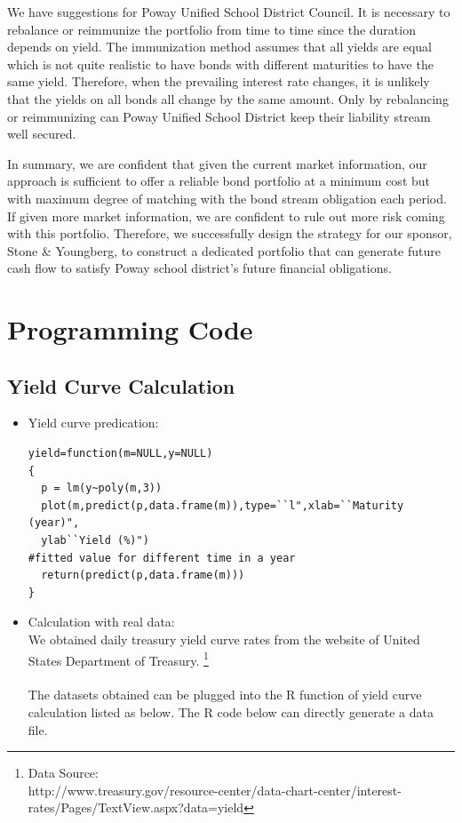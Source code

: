 \documentclass[oneside,12pt]{report}
\begin{document}
{\begin{itemize}
We have suggestions for Poway Unified School District Council. It is necessary to rebalance or reimmunize the portfolio from time to time since the duration depends on yield. The immunization method assumes that all yields are equal which is not quite realistic to have bonds with different maturities to have the same yield. Therefore, when the prevailing interest rate changes, it is unlikely that the yields on all bonds all change by the same amount. Only by rebalancing or reimmunizing can Poway Unified School District keep their liability stream well secured. \\
\end{itemize}
\noindent In summary, we are confident that given the current market information, our approach is sufficient to offer a reliable bond portfolio at a minimum cost but with maximum degree of matching with the bond stream obligation each period. If given more market information, we are confident to rule out more risk coming with this portfolio. Therefore, we successfully design the strategy for our sponsor, Stone \& Youngberg, to construct a dedicated portfolio that can generate future cash flow to satisfy Poway school district's future financial obligations. 



\appendix
{}
\chapter{Programming Code}\label{Programming Code}
\section{Yield Curve Calculation}
\begin{itemize}
\item Yield curve predication:
\\

\begin{lstlisting}
yield=function(m=NULL,y=NULL)
{ 
  p = lm(y~poly(m,3))
  plot(m,predict(p,data.frame(m)),type=``l",xlab=``Maturity (year)",
  ylab``Yield (%)")  
#fitted value for different time in a year
  return(predict(p,data.frame(m)))
}
\end{lstlisting}
\vspace{8pt}
\item Calculation with real data:\\
We obtained daily treasury yield curve rates from the website of United States Department of Treasury. \footnote{Data Source: \\
http://www.treasury.gov/resource-center/data-chart-center/interest-rates/Pages/TextView.aspx?data=yield}\\
\\
The datasets obtained can be plugged into the R function of yield curve calculation listed as below. The R code below can directly generate a data file.\\


\end{itemize}}
\end{document}

